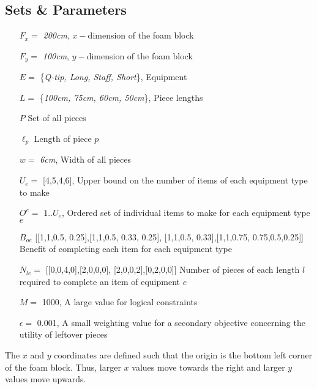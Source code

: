 \documentclass[10pt,a4paper]{article}
\begin{document}
\label{section:mathmodel}
\subsection*{Sets \& Parameters}
\begin{itemize}
\item[$F_x=$] \textit{200cm}, $x-$dimension of the foam block
\item[$F_y=$] \textit{100cm}, $y-$dimension of the foam block
\item[$E=$] \{\textit{Q-tip, Long, Staff, Short}\}, Equipment
\item[$L=$] \{\textit{100cm, 75cm, 60cm, 50cm}\}, Piece lengths
\item[$P$] Set of all pieces
\item[$\ell_p$] Length of piece $p$
\item[$w= $] \textit{6cm}, Width of all pieces
\item[$U_e =$] [4,5,4,6], Upper bound on the number of items of each equipment type to make
\item[$O^e=$] $1..U_e$, Ordered set of individual items to make for each equipment type $e$
\item[$B_{oe}$] [[1,1,0.5, 0.25],[1,1,0.5, 0.33, 0.25], [1,1,0.5, 0.33],[1,1,0.75, 0.75,0.5,0.25]] Benefit of completing each item for each equipment type
\item[$N_{le} = $] [[0,0,4,0],[2,0,0,0], [2,0,0,2],[0,2,0,0]] Number of pieces of each length $l$ required to complete an item of equipment $e$
\item[$M=$] 1000, A large value for logical constraints
\item[$\epsilon=$] 0.001, A small weighting value for a secondary objective concerning the utility of leftover pieces
\end{itemize}
The $x$ and $y$ coordinates are defined such that the origin is the bottom left corner of the foam block. Thus, larger $x$ values move towards the right and larger $y$ values move upwards.
\end{document}
